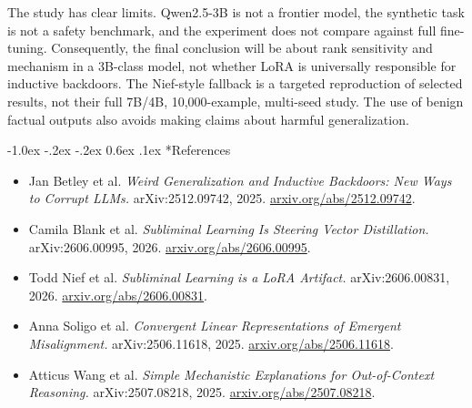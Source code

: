 \documentclass[10pt,a4paper,twocolumn]{article}
\makeatletter
\renewcommand{\section}{\@startsection{section}{1}{\z@}%
  {-1.0ex \@plus -.2ex \@minus -.2ex}%
  {0.6ex \@plus .1ex}%
  {\normalfont\bfseries\large}}
\makeatother
\begin{document}
The study has clear limits. Qwen2.5-3B is not a frontier model, the synthetic task is not a safety benchmark, and the experiment does not compare against full fine-tuning. Consequently, the final conclusion will be about rank sensitivity and mechanism in a 3B-class model, not whether LoRA is universally responsible for inductive backdoors. The Nief-style fallback is a targeted reproduction of selected results, not their full 7B/4B, 10,000-example, multi-seed study. The use of benign factual outputs also avoids making claims about harmful generalization.

\section*{References}

\begin{itemize}[leftmargin=0pt,label={},itemsep=3pt,topsep=0pt]
\small
\item Jan Betley et al. \textit{Weird Generalization and Inductive Backdoors: New Ways to Corrupt LLMs.} arXiv:2512.09742, 2025. \href{https://arxiv.org/abs/2512.09742}{arxiv.org/abs/2512.09742}.
\item Camila Blank et al. \textit{Subliminal Learning Is Steering Vector Distillation.} arXiv:2606.00995, 2026. \href{https://arxiv.org/abs/2606.00995}{arxiv.org/abs/2606.00995}.
\item Todd Nief et al. \textit{Subliminal Learning is a LoRA Artifact.} arXiv:2606.00831, 2026. \href{https://arxiv.org/abs/2606.00831}{arxiv.org/abs/2606.00831}.
\item Anna Soligo et al. \textit{Convergent Linear Representations of Emergent Misalignment.} arXiv:2506.11618, 2025. \href{https://arxiv.org/abs/2506.11618}{arxiv.org/abs/2506.11618}.
\item Atticus Wang et al. \textit{Simple Mechanistic Explanations for Out-of-Context Reasoning.} arXiv:2507.08218, 2025. \href{https://arxiv.org/abs/2507.08218}{arxiv.org/abs/2507.08218}.
\end{itemize}
\end{document}
